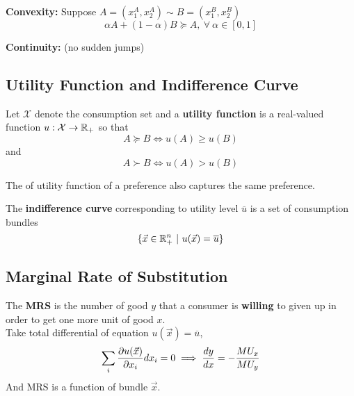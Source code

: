 \documentclass[]{article}
\begin{document}
            \begin{definition}
                \textbf{Convexity: } Suppose $A = (x_1^A, x_2^A) \sim B = (x_1^B, x_2^B)$
                \[
                    \alpha A + (1 - \alpha) B \succcurlyeq A,\ \forall \ \alpha \in [0, 1]
                \]
            \end{definition}
            
            \begin{definition}
                \textbf{Continuity: } (no sudden jumps)
            \end{definition}
        
        \subsection{Utility Function and Indifference Curve}
            \begin{definition}
                Let $\mathcal{X}$ denote the consumption set and a \textbf{utility function} is a real-valued function $u:\mathcal{X} \rightarrow \mathbb{R}_+$ so that
                \[
                    A \succcurlyeq B \iff u(A) \geq u(B)
                \]
                and
                \[
                    A \succ B \iff u(A) > u(B)
                \]
            \end{definition}
            
            \begin{remark}
                The  of utility function of a preference also captures the same preference. 
            \end{remark}
            
            \begin{definition}
                The \textbf{indifference curve} corresponding to utility level $\overline{u}$ is a set of consumption bundles
                \[
                    \{\vec{x} \in \mathbb{R}^n_+\ \vert\ u(\vec{x}) = \overline{u} \}
                \]
            \end{definition}
            
        \subsection{Marginal Rate of Substitution}
            \begin{definition}
                The \textbf{MRS} is the number of good $y$ that a consumer is \textbf{willing} to given up in order to get one more unit of good $x$.
                \\Take total differential of equation $u(\vec{x}) = \overline{u}$,
                \[
                    \sum_{i}{
                        \frac{\partial{u(\vec{x})}}{\partial{x_i}} d{x_i} = 0
                        }
                    \implies
                    \frac{dy}{dx} = -\frac{MU_x}{MU_y}
                \]
                And MRS is a function of bundle $\vec{x}$.
            \end{definition}
            
\end{document}

